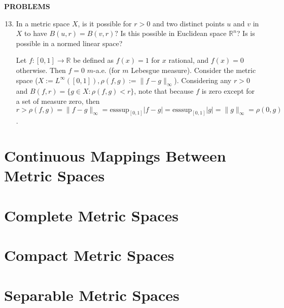 \begin{center}
	\textbf{PROBLEMS}
\end{center}
\begin{enumerate}
    \setcounter{enumi}{12}
    \item In a metric space $X$, is it possible for $r>0$ and two distinct points $u$ and $v$ in $X$ to have $B(u,r)=B(v,r)?$
    Is this possible in Euclidean space $\mathbb{R}^n$?
    Is is possible in a normed linear space?

    Let $f:[0,1]\to\mathbb{R}$ be defined as $f(x)=1$ for $x$ rational, and $f(x)=0$ otherwise.
    Then $f=0$ $m$-a.e. (for $m$ Lebesgue measure).
    Consider the metric space ($X:=L^\infty([0,1]),\rho(f,g):=\|f-g\|_\infty$).
    Considering any $r>0$ and $B(f,r)=\{g\in X:\rho(f,g)<r\}$, note that because $f$ is zero except for a set of measure zero, then $r>\rho(f,g)=\|f-g\|_\infty=\text{esssup}_{[0,1]}|f-g|=\text{esssup}_{[0,1]}|g|=\|g\|_\infty=\rho(0,g)$.

\end{enumerate}

\section{Continuous Mappings Between Metric Spaces}

\section{Complete Metric Spaces}

\section{Compact Metric Spaces}

\section{Separable Metric Spaces}
